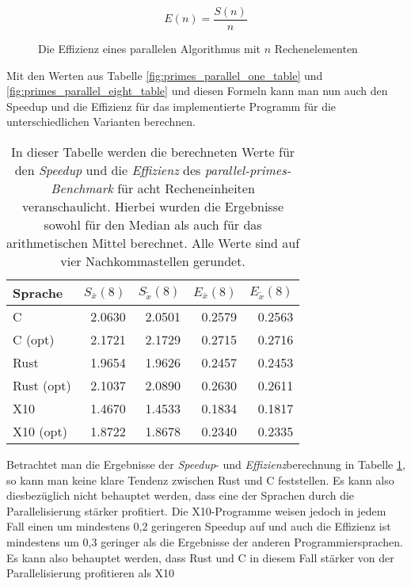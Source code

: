 \begin{figure}
	\caption{Die Effizienz eines parallelen Algorithmus mit $n$ Rechenelementen}
	\begin{equation*}
		E(n) = \frac{S(n)}{n}
	\end{equation*}
	\label{formula:effizienz}
\end{figure}

Mit den Werten aus Tabelle \ref{fig:primes_parallel_one_table} und \ref{fig:primes_parallel_eight_table} und diesen
Formeln kann man nun auch den Speedup und die Effizienz für das implementierte Programm für die unterschiedlichen
Varianten berechnen.

\begin{table}[hb]
	\begin{center}
		\begin{tabular}{lrrrr}
			\toprule
			Sprache & $S_{\bar{x}}(8)$ & $S_{\tilde{x}}(8)$ & $E_{\bar{x}}(8)$ & $E_{\tilde{x}}(8)$ \\
			\midrule
			C          & 2.0630 & 2.0501 & 0.2579 & 0.2563 \\
			C (opt)    & 2.1721 & 2.1729 & 0.2715 & 0.2716 \\
			Rust       & 1.9654 & 1.9626 & 0.2457 & 0.2453 \\
			Rust (opt) & 2.1037 & 2.0890 & 0.2630 & 0.2611 \\
			X10        & 1.4670 & 1.4533 & 0.1834 & 0.1817 \\
			X10 (opt)  & 1.8722 & 1.8678 & 0.2340 & 0.2335 \\
			\bottomrule
		\end{tabular}
	\end{center}
	\caption{
		In dieser Tabelle werden die berechneten Werte für den \textit{Speedup} und die \textit{Effizienz}
		des \textit{parallel-primes-Benchmark} für acht Recheneinheiten veranschaulicht.
		Hierbei wurden die Ergebnisse sowohl für den
		Median als auch für das arithmetischen Mittel berechnet. Alle Werte sind auf vier Nachkommastellen gerundet.
	}
	\label{fig:primes_parallel_speedup_efficiency_table}
\end{table}

Betrachtet man die Ergebnisse der \textit{Speedup}- und \textit{Effizienz}berechnung in Tabelle
\ref{fig:primes_parallel_speedup_efficiency_table}, so kann man keine klare Tendenz zwischen Rust und C feststellen.
Es kann also diesbezüglich nicht behauptet werden, dass eine der Sprachen durch die Parallelisierung stärker profitiert.
Die X10-Programme weisen jedoch in jedem Fall einen um mindestens 0,2 geringeren Speedup auf und auch die Effizienz ist mindestens
um 0,3 geringer als die Ergebnisse der anderen Programmiersprachen. Es kann also behauptet werden, dass Rust und C in diesem Fall
stärker von der Parallelisierung profitieren als X10


